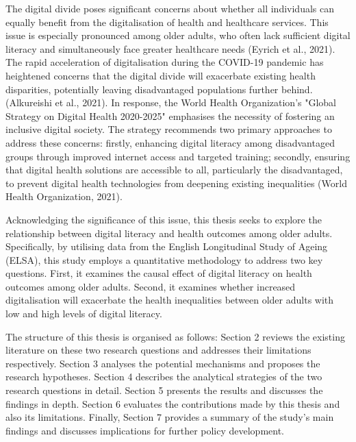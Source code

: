 The digital divide poses significant concerns about whether all individuals can equally benefit from the digitalisation of health and healthcare services. This issue is especially pronounced among older adults, who often lack sufficient digital literacy and simultaneously face greater healthcare needs (Eyrich et al., 2021). The rapid acceleration of digitalisation during the COVID-19 pandemic has heightened concerns that the digital divide will exacerbate existing health disparities, potentially leaving disadvantaged populations further behind. (Alkureishi et al., 2021). In response, the World Health Organization's "Global Strategy on Digital Health 2020-2025" emphasises the necessity of fostering an inclusive digital society. The strategy recommends two primary approaches to address these concerns: firstly, enhancing digital literacy among disadvantaged groups through improved internet access and targeted training; secondly, ensuring that digital health solutions are accessible to all, particularly the disadvantaged, to prevent digital health technologies from deepening existing inequalities (World Health Organization, 2021). 

Acknowledging the significance of this issue, this thesis seeks to explore the relationship between digital literacy and health outcomes among older adults. Specifically, by utilising data from the English Longitudinal Study of Ageing (ELSA), this study employs a quantitative methodology to address two key questions. First, it examines the causal effect of digital literacy on health outcomes among older adults. Second, it examines whether increased digitalisation will exacerbate the health inequalities between older adults with low and high levels of digital literacy.

The structure of this thesis is organised as follows: Section 2 reviews the existing literature on these two research questions and addresses their limitations respectively. Section 3 analyses the potential mechanisms and proposes the research hypotheses. Section 4 describes the analytical strategies of the two research questions in detail. Section 5 presents the results and discusses the findings in depth. Section 6 evaluates the contributions made by this thesis and also its limitations. Finally, Section 7 provides a summary of the study's main findings and discusses implications for further policy development.

